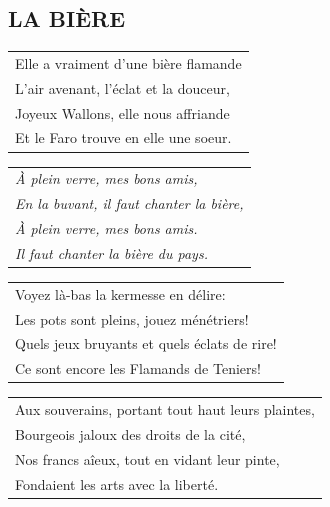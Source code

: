 \documentclass[a4paper, 14pt]{extarticle}
\begin{document}
\subsection*{LA BIÈRE
}
\begin{flushleft}
\begin{tabularx}{0.8\textwidth} {
   >{\raggedright\arraybackslash}X}
Elle a vraiment d’une bière flamande \\
L’air avenant, l’éclat et la douceur, \\
Joyeux Wallons, elle nous affriande \\
Et le Faro trouve en elle une soeur. \\
\end{tabularx}
\end{flushleft}
\begin{flushleft}
\begin{tabularx}{0.8\textwidth} {
   >{\raggedright\arraybackslash}X}
\textit{À plein verre, mes bons amis,} \\
\textit{En la buvant, il faut chanter la bière,} \\
\textit{À plein verre, mes bons amis.} \\
\textit{Il faut chanter la bière du pays.} \\
\end{tabularx}
\end{flushleft}
\begin{flushleft}
\begin{tabularx}{0.8\textwidth} {
   >{\raggedright\arraybackslash}X}
Voyez là-bas la kermesse en délire: \\
Les pots sont pleins, jouez ménétriers!\\
Quels jeux bruyants et quels éclats de rire!\\
Ce sont encore les Flamands de Teniers!\\
\end{tabularx}
\end{flushleft}
\begin{flushleft}
\begin{tabularx}{0.8\textwidth} {
   >{\raggedright\arraybackslash}X}
Aux souverains, portant tout haut leurs plaintes, \\
Bourgeois jaloux des droits de la cité, \\
Nos francs aîeux, tout en vidant leur pinte, \\
Fondaient les arts avec la liberté. \\
\end{tabularx}
\end{flushleft}
\end{document}
